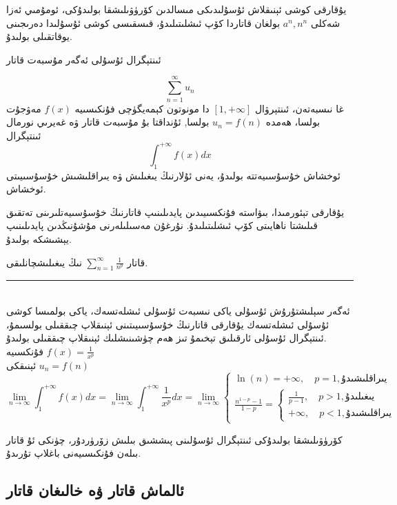 يۇقارقى كوشى ئېنىقلاش ئۇسۇلىدىكى مىسالدىن كۆرۈۋىلىشقا بولىدۇكى، ئومۇمىي ئەزا شەكلى 
$a^n,n^n$
بولغان قاتاردا كۆپ ئىشلىتىلىدۇ، قىسقىسى كوشى ئۇسۇلىدا دەرىجىنى يوقاتقىلى بولىدۇ.
\begin{MyTheorem}{ئىنتېگرال ئۇسۇلى}{}%
	ئەگەر مۇسبەت قاتار
	
	$$\sum\limits_{n=1}^\infty u_n$$
	غا نىسبەتەن، ئىنتېرۋال $[1,+\infty]$ دا مونوتون كېمەيگۈچى فۇنكىسىيە $f(x)$ مەۋجۇت بولسا، ھەمدە $u_n=f(n)$ بولسا, ئۇنداقتا بۇ مۇسبەت قاتار ۋە غەيرىي نورمال ئىنتېگرال
	$$\int_{1}^{+\infty}f(x)dx$$
	ئوخشاش خۇسۇسىيەتتە بولىدۇ، يەنى ئۇلارنىڭ يىغىلىش ۋە يىراقلىشىش خۇسۇسىيىتى ئوخشاش.
\end{MyTheorem}
يۇقارقى تېئورمىدا، بىۋاستە فۇنكسىيىدىن پايدىلىنىپ قاتارنىڭ خۇسۇسىيەتلىرىنى تەتقىق قىلىشتا ناھايىتى كۆپ ئىشلىتىلىدۇ. نۇرغۇن مەسىلىلەرنى مۇشۇنىڭدىن پايدىلىنىپ يېشىشكە بولىدۇ.
\begin{myexample}
قاتار
$\sum\limits_{n=1}^\infty \frac{1}{n^p}$
نىڭ يىغىلىشچانلىقى.
\\\rule{\linewidth}{0.05em}\\
ئەگەر سېلىشتۇرۇش ئۇسۇلى ياكى نىسبەت ئۇسۇلى ئىشلەتسەك، ياكى بولمىسا كوشى ئۇسۇلى ئىشلەتسەك يۇقارقى قاتارنىڭ خۇسۇسىيىتىنى ئېنىقلاپ چىققىلى بولسىمۇ، ئىنتېگرال ئۇسۇلى ئارقىلىق تېخىمۇ تىز ھەم چۈشىنىشلىك ئېنىقلاپ چىققىلى بولىدۇ.\\
فۇنكسىيە 
$f(x) = \frac{1}{x^p}$\\
ئېنىقكى 
$u_n = f(n)$
$$
\lim\limits_{n \to \infty} \int_{1}^{+\infty}f(x)dx =
\lim\limits_{n \to \infty} \int_{1}^{+\infty} \frac{1}{x^p}dx = \lim\limits_{n \to \infty}
\left\{\begin{array}{l}
	\ln(n)=+\infty, \quad p=1, \text{يىراقلىشىدۇ}\\
	\frac{n^{1-p}-1}{1-p} = 
	\left\{\begin{array}{l}
		\frac{1}{p-1}, \quad p>1, \text{يىغىلىدۇ}\\
		+\infty, \quad p < 1, \text{يىراقلىشىدۇ}
	\end{array}\right.
\end{array}\right.
$$
\end{myexample}
كۆرۈۋىلىشقا بولىدۇكى ئىنتېگرال ئۇسۇلىنى پىششىق بىلىش زۆرۈردۇر، چۈنكى ئۇ قاتار بىلەن فۇنكىسىيەنى باغلاپ تۇرىدۇ.
\subsection{ئالماش قاتار ۋە خالىغان قاتار}

